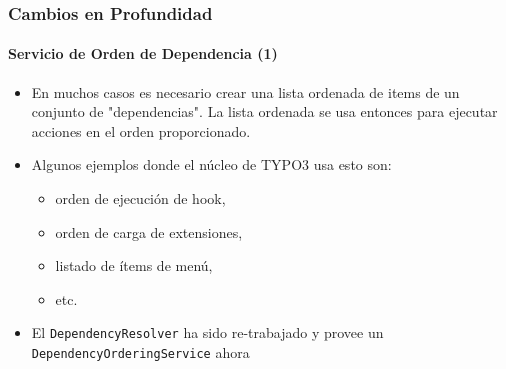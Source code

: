 \begin{frame}[fragile]
	\frametitle{Cambios en Profundidad}
	\framesubtitle{Servicio de Orden de Dependencia (1)}

	\begin{itemize}

		\item En muchos casos es necesario crear una lista ordenada de items de un conjunto de "dependencias".
			La lista ordenada se usa entonces para ejecutar acciones en el orden proporcionado.

		\item Algunos ejemplos donde el núcleo de TYPO3 usa esto son:

			\begin{itemize}
				\item orden de ejecución de hook,
				\item orden de carga de extensiones,
				\item listado de ítems de menú,
				\item etc.
			\end{itemize}

		\item El \texttt{DependencyResolver} ha sido re-trabajado y provee un
			\texttt{DependencyOrderingService} ahora

	\end{itemize}

\end{frame}



